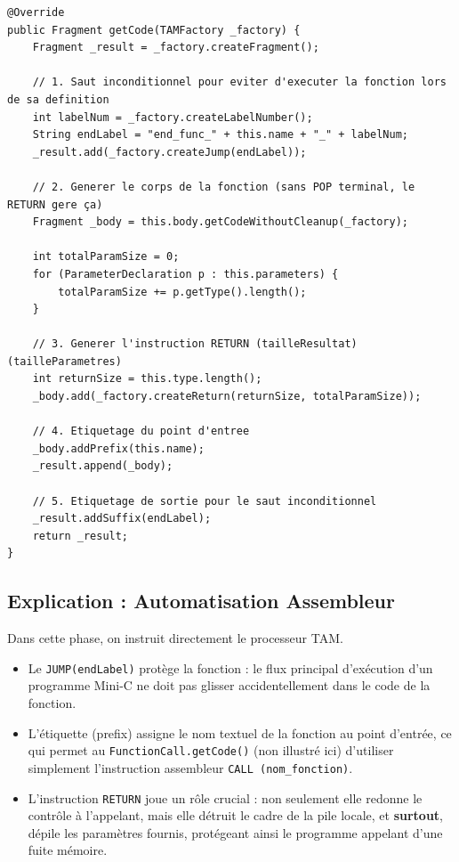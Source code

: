 \documentclass[12pt,a4paper]{article}
\begin{document}
\begin{lstlisting}[caption={Extrait de FunctionDeclaration.java - Génération de Code}]
@Override
public Fragment getCode(TAMFactory _factory) {
    Fragment _result = _factory.createFragment();
    
    // 1. Saut inconditionnel pour eviter d'executer la fonction lors de sa definition
    int labelNum = _factory.createLabelNumber();
    String endLabel = "end_func_" + this.name + "_" + labelNum;
    _result.add(_factory.createJump(endLabel));
    
    // 2. Generer le corps de la fonction (sans POP terminal, le RETURN gere ça)
    Fragment _body = this.body.getCodeWithoutCleanup(_factory);
    
    int totalParamSize = 0;
    for (ParameterDeclaration p : this.parameters) {
        totalParamSize += p.getType().length();
    }
    
    // 3. Generer l'instruction RETURN (tailleResultat) (tailleParametres)
    int returnSize = this.type.length();
    _body.add(_factory.createReturn(returnSize, totalParamSize));
    
    // 4. Etiquetage du point d'entree
    _body.addPrefix(this.name);
    _result.append(_body);
    
    // 5. Etiquetage de sortie pour le saut inconditionnel
    _result.addSuffix(endLabel);
    return _result;
}
\end{lstlisting}

\subsection{Explication : Automatisation Assembleur}
Dans cette phase, on instruit directement le processeur TAM. 
\begin{itemize}
    \item Le \texttt{JUMP(endLabel)} protège la fonction : le flux principal d'exécution d'un programme Mini-C ne doit pas glisser accidentellement dans le code de la fonction. 
    \item L'étiquette (prefix) assigne le nom textuel de la fonction au point d'entrée, ce qui permet au \texttt{FunctionCall.getCode()} (non illustré ici) d'utiliser simplement l'instruction assembleur \texttt{CALL (nom\_fonction)}.
    \item L'instruction \texttt{RETURN} joue un rôle crucial : non seulement elle redonne le contrôle à l'appelant, mais elle détruit le cadre de la pile locale, et \textbf{surtout}, dépile les paramètres fournis, protégeant ainsi le programme appelant d'une fuite mémoire.
\end{itemize}
\end{document}
